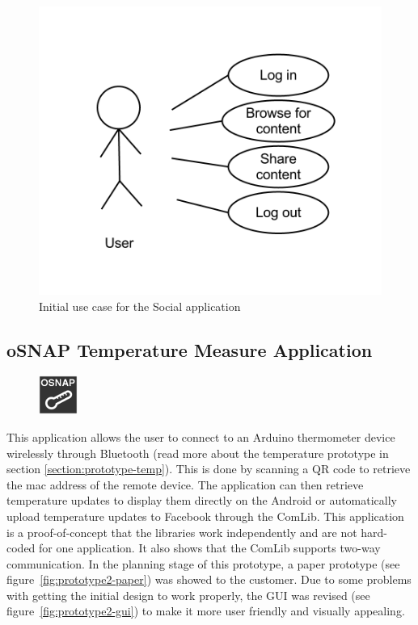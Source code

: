 \begin{figure}[H]
	\centering \includegraphics[scale=0.35]{img/design-socialappusecase1}
	\caption{Initial use case for the Social application}
	\label{fig:design-socialappusecase1}
\end{figure}

\subsection{oSNAP Temperature Measure Application}
\begin{figure}
	\centering \includegraphics[scale=1]{img/app-temp}
\end{figure}
This application allows the user to connect to an Arduino thermometer device wirelessly through Bluetooth (read more about the 
temperature prototype in section \ref{section:prototype-temp}). This is done by scanning a QR code to retrieve the mac address
 of the remote device. The application can then retrieve temperature updates to display them directly on the Android or automatically 
upload temperature updates to Facebook through the ComLib. This application is a proof-of-concept that the libraries work independently
 and are not hard-coded for one application. It also shows that the ComLib supports two-way communication.
In the planning stage of this prototype, a paper prototype (see figure~\ref{fig:prototype2-paper}) was showed to the
customer. Due to some problems with getting the initial design to work properly, the GUI was revised (see
figure~\ref{fig:prototype2-gui}) to make it more user friendly and visually appealing.


